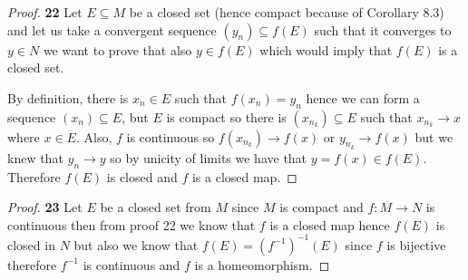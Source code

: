 \documentclass[11pt]{article}
\theoremstyle{definition}
\begin{document}
    \begin{proof}{\textbf{22}}
        Let $E \subseteq M$ be a closed set (hence compact because of
        Corollary 8.3) and let us take a convergent sequence
        $(y_n) \subseteq f(E)$ such that it converges to $y \in N$ we want to
        prove that also $y \in f(E)$ which would imply that $f(E)$ is a
        closed set.

        By definition, there is $x_n \in E$ such that $f(x_n) = y_n$ hence
        we can form a sequence $(x_n) \subseteq E$, but $E$ is compact
        so there is $(x_{n_k}) \subseteq E$ such that $x_{n_k} \to x$ where
        $x \in E$. Also, $f$ is continuous so $f(x_{n_k}) \to f(x)$ or
        $y_{n_k} \to f(x)$ but we knew that $y_n \to y$ so by unicity
        of limits we have that $y = f(x) \in f(E)$. Therefore $f(E)$ is closed
        and $f$ is a closed map.
    \end{proof}
    \begin{proof}{\textbf{23}}
        Let $E$ be a closed set from $M$ since $M$ is compact and $f:M \to N$
        is continuous then from proof 22 we know that $f$ is a closed map hence
        $f(E)$ is closed in $N$ but also we know that $f(E) = (f^{-1})^{-1}(E)$
        since $f$ is bijective therefore $f^{-1}$ is continuous and $f$ is a
        homeomorphism.  
    \end{proof}
\cleardoublepage
\end{document}
